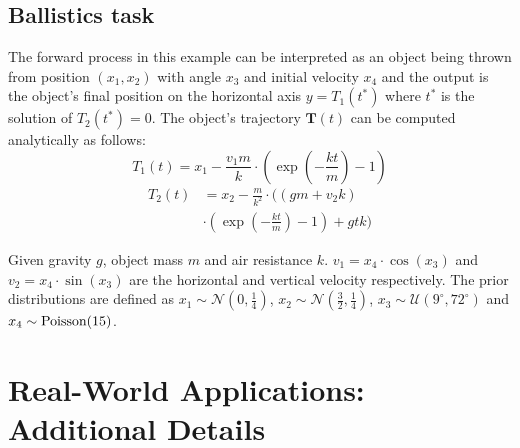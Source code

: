 \documentclass[letterpaper]{article} %
\begin{document}
\subsection{Ballistics task}
The forward process in this example can be interpreted as an object being thrown from position $(x_1, x_2)$ with angle $x_3$ and initial velocity $x_4$ and the output is the object's final position on the horizontal axis $y = T_1(t^*)$ where $t^*$ is the solution of $T_2(t^*)=0$. The object's trajectory $\mathbf{T}(t)$ can be computed analytically as follows:
\begin{equation}
    T_1(t) =x_1 - \frac{v_1 m}{k}\cdot \left( \exp\left(-\frac{kt}{m}\right)-1\right)
\end{equation}
\begin{equation}
\begin{aligned}
    T_2(t) &=x_2 - \frac{m}{k^2} \cdot ( \left( gm + v_2 k \right) \\ &\cdot \left(\exp\left(-\frac{kt}{m} \right)-1 \right) + gtk )
\end{aligned}
\end{equation}

Given gravity $g$, object mass $m$ and air resistance $k$. $v_1=x_4 \cdot \cos(x_3)$ and $v_2 = x_4 \cdot \sin(x_3)$ are the horizontal and vertical velocity respectively. The prior distributions are defined as $x_1 \sim \mathcal{N}(0, \frac{1}{4})$, $x_2 \sim \mathcal{N}(\frac{3}{2}, \frac{1}{4})$, $x_3 \sim \mathcal{U}(9^{\circ},72^{\circ})$ and $x_4 \sim \textup{Poisson}(15)$. 


\section{Real-World Applications: Additional Details}
\end{document}
